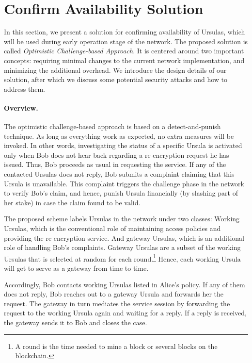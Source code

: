 \section{Confirm Availability Solution}
\label{confirm-availability}
In this section, we present a solution for confirming availability of Ursulas, which will be used during early operation stage of the network. The proposed solution is called \emph{Optimistic Challenge-based Approach}. It is centered around two important concepts: requiring minimal changes to the current network implementation, and minimizing the additional overhead. We introduce the design details of our solution, after which we discuss some potential security attacks and how to address them.


\paragraph{\bf Overview.} The optimistic challenge-based approach is based on a detect-and-punish technique. As long as everything work as expected, no extra measures will be invoked. In other words, investigating the status of a specific Ursula is activated only when Bob does not hear back regarding a re-encryption request he has issued. Thus, Bob proceeds as usual in requesting the service. If any of the contacted Ursulas does not reply, Bob submits a complaint claiming that this Ursula is unavailable. This complaint triggers the challenge phase in the network to verify Bob's claim, and hence, punish Ursula financially (by slashing part of her stake) in case the claim found to be valid.


The proposed scheme labels Ursulas in the network under two classes: Working Ursulas, which is the conventional role of maintaining access policies and providing the re-encryption service. And gateway Ursulas, which is an additional role of handling Bob's complaints. Gateway Ursulas are a subset of the working Ursulas that is selected at random for each round.\footnote{A round is the time needed to mine a block or several blocks on the blockchain.} Hence, each working Ursula will get to serve as a gateway from time to time. 


Accordingly, Bob contacts working Ursulas listed in Alice's policy. If any of them does not reply, Bob reaches out to a gateway Ursula and forwards her the request. The gateway in turn mediates the service session by forwarding the request to the working Ursula again and waiting for a reply. If a reply is received, the gateway sends it to Bob and closes the case. 



